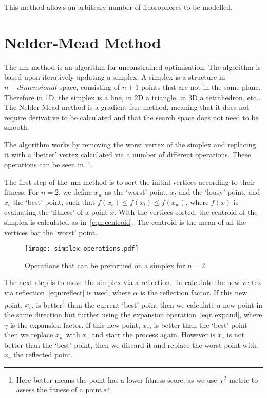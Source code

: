This method allows an arbitrary number of fluorophores to be modelled.


\section{Nelder-Mead Method}

The \gls*{nm} method is an algorithm for unconstrained optimisation. 
The algorithm is based upon iteratively updating a simplex. 
A simplex is a structure in $n-dimensional$ space, consisting of $n+1$ points that are not in the same plane. 
Therefore in 1D, the simplex is a line, in 2D a triangle, in 3D a tetrahedron, etc.. 
The Nelder-Mead method is a gradient free method, meaning that it does not require derivative to be calculated and that the search space does not need to be smooth.

The algorithm works by removing the worst vertex of the simplex and replacing it with a `better' vertex calculated via a number of different operations.
These operations can be seen in~\cref{fig:NM-operations}.

The first step of the~\gls*{nm} method is to sort the initial vertices according to their fitness.
For $n=2$, we define $x_w$ as the `worst' point, $x_l$ and the `lousy' point, and $x_b$ the `best' point, such that $f(x_b)\leq f(x_l)\leq f(x_w)$, where $f(x)$ is evaluating the `fitness' of a point $x$.
With the vertices sorted, the centroid of the simplex is calculated as in~\cref{eqn:centroid}.
The centroid is the mean of all the vertices bar the `worst' point.

\begin{figure}[!htbp]
    \centering
    \texttt{[image: simplex-operations.pdf]}
    \caption{Operations that can be preformed on a simplex for $n=2$.}
    \label{fig:NM-operations}
\end{figure}

The next step is to move the simplex via a reflection.
To calculate the new vertex via reflection~\cref{eqn:reflect} is used, where $\alpha$ is the reflection factor.
If this new point, $x_r$, is better\footnote{Here better means the point has a lower fitness score, as we use $\chi^2$ metric to assess the fitness of a point.} than the current `best' point then we calculate a new point in the same direction but further using the expansion operation~\cref{eqn:expand}, where $\gamma$ is the expansion factor.
If this new point, $x_e$, is better than the `best' point then we replace $x_w$ with $x_e$ and start the process again.
However is $x_e$ is not better than the `best' point, then we discard it and replace the worst point with $x_r$ the reflected point.

